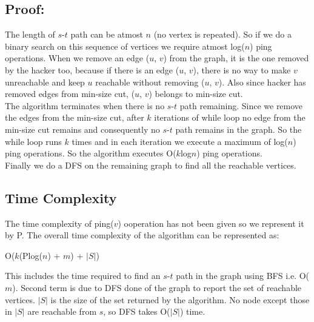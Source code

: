 \documentclass[a4paper,12pt]{article}
\begin{document}
\subsection{Proof:}
The length of $s$-$t$ path can be atmost $n$ (no vertex is repeated). So if we do a binary search on 
this sequence of vertices we require atmost log($n$) ping operations. When we remove an edge ($u$, $v$) from the graph,
it is the one removed by the hacker too, because if there is an edge ($u$, $v$), there is no way to make $v$ unreachable 
and keep $u$ reachable without removing ($u$, $v$). Also since hacker has removed edges from min-size cut, ($u$, $v$) belongs
to min-size cut.\\
The algorithm terminates when there is no $s$-$t$ path remaining. Since we remove the edges from the min-size cut,
after $k$ iterations of while loop no edge from the min-size cut remains and consequently no $s$-$t$ path remains in the graph.
So the while loop runs $k$ times and in each iteration we execute a maximum of log($n$) ping operations.
So the algorithm executes O($k$log$n$) ping operations.\\
Finally we do a DFS on the remaining graph to find all the reachable vertices.
\subsection{Time Complexity}
The time complexity of ping($v$) ooperation has not been given so we represent it by P. The overall
time complexity of the algorithm can be represented as:
\begin{center}
 O($k$(Plog($n$) + $m$) + $|S|$)
\end{center}
This includes the time required to find an $s$-$t$ path in the graph using BFS i.e. O($m$).
Second term is due to DFS done of the graph to report the set of reachable vertices. $|S|$ is the size
of the set returned by the algorithm. No node except those in $|S|$ are reachable from $s$, so DFS takes
O($|S|$) time.
\end{document}
